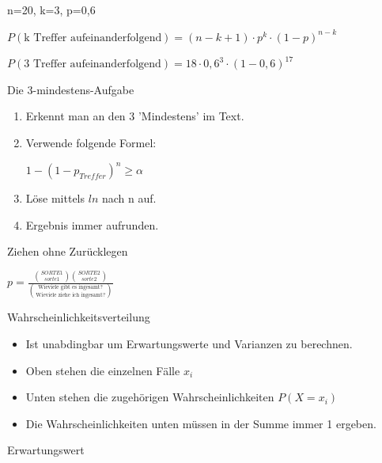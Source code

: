 \documentclass[paper=a6,landscape,ngerman,twoside=true,fontsize=12pt]{scrartcl}
\begin{document}
\begin{antwort}
	n=20, k=3, p=0,6
	
	\bigskip
	$P(\text{k Treffer aufeinanderfolgend})=(n-k+1)\cdot p^{k} \cdot (1-p)^{n-k}$
	
	$P(\text{3 Treffer aufeinanderfolgend})=18\cdot 0,6^{3} \cdot (1-0,6)^{17}$
	
\end{antwort}
\begin{frage}
	Die 3-mindestens-Aufgabe
	
\end{frage}
\begin{antwort}
	\begin{enumerate}
		\item Erkennt man an den 3 'Mindestens' im Text. 
		\item Verwende folgende Formel:
		
		 $1-(1-p_{Treffer})^n\geq \alpha$
		\item Löse mittels $ln$ nach  n auf.
		\item Ergebnis immer aufrunden.
	\end{enumerate}
	
\end{antwort}
\begin{frage}
	Ziehen ohne Zurücklegen
	
\end{frage}
\begin{antwort}
	\LARGE
	 $p=\frac{\binom{SORTE1}{sorte1}\binom{SORTE2}{sorte2}}{\binom{\text{Wieviele gibt es ingesamt?}}{\text{Wieviele ziehe ich ingesamt?}}}$
	
\end{antwort}
\begin{frage}
	Wahrscheinlichkeitsverteilung
	
\end{frage}
\begin{antwort}
	\begin{itemize}
		\item Ist unabdingbar um Erwartungswerte und Varianzen zu berechnen. 
		\item Oben stehen die einzelnen Fälle $x_i$
		\item Unten stehen die zugehörigen Wahrscheinlichkeiten $P(X=x_i)$
		\item Die Wahrscheinlichkeiten unten müssen in der Summe immer 1 ergeben.
	\end{itemize}	
\end{antwort}	
\begin{frage}
	Erwartungswert
	
\end{frage}
\end{document}
